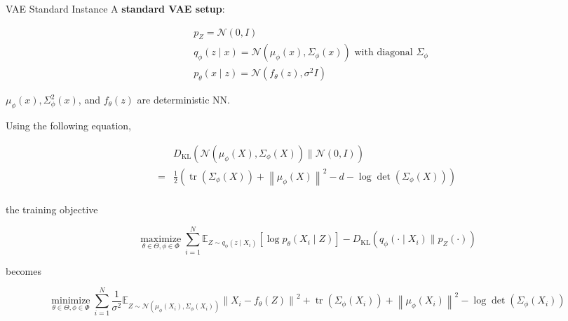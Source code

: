 \begin{frame}[allowframebreaks]

\begin{mydefinitionblock}{11.17}{VAE Standard Instance}
    A \textbf{standard VAE setup}:

    $$
    \begin{aligned}
    & p_{Z}=\mathcal{N}(0, I) \\
    & q_{\phi}(z \mid x)=\mathcal{N}\left(\mu_{\phi}(x), \Sigma_{\phi}(x)\right) \text { with diagonal } \Sigma_{\phi} \\
    & p_{\theta}(x \mid z)=\mathcal{N}\left(f_{\theta}(z), \sigma^{2} I\right)
    \end{aligned}
    $$

    $\mu_{\phi}(x), \Sigma_{\phi}^{2}(x)$, and $f_{\theta}(z)$ are deterministic NN.

    \par\noindent\textcolor{gray}{\hdashrule{\textwidth}{0.4pt}{1pt 2pt}}

    Using the following equation,

    $$
    \begin{aligned}
    & D_{\mathrm{KL}}\left(\mathcal{N}\left(\mu_{\phi}(X), \Sigma_{\phi}(X)\right) \| \mathcal{N}(0, I)\right) \\
    = & \frac{1}{2}\left(\operatorname{tr}\left(\Sigma_{\phi}(X)\right)+\left\|\mu_{\phi}(X)\right\|^{2}-d-\log \operatorname{det}\left(\Sigma_{\phi}(X)\right)\right) \\
    \end{aligned}
    $$

    the training objective

    $$
    \underset{\theta \in \Theta, \phi \in \Phi}{\operatorname{maximize}} \sum_{i=1}^{N} \mathbb{E}_{Z \sim q_{\phi}\left(z \mid X_{i}\right)}\left[\log p_{\theta}\left(X_{i} \mid Z\right)\right]-D_{\mathrm{KL}}\left(q_{\phi}\left(\cdot \mid X_{i}\right) \| p_{Z}(\cdot)\right)
    $$

    becomes

    $$
    \underset{\theta \in \Theta, \phi \in \Phi}{\operatorname{minimize}} \sum_{i=1}^{N} \frac{1}{\sigma^{2}} \mathbb{E}_{Z \sim \mathcal{N}\left(\mu_{\phi}\left(X_{i}\right), \Sigma_{\phi}\left(X_{i}\right)\right)}\left\|X_{i}-f_{\theta}(Z)\right\|^{2}+\operatorname{tr}\left(\Sigma_{\phi}\left(X_{i}\right)\right)+\left\|\mu_{\phi}\left(X_{i}\right)\right\|^{2}-\log \operatorname{det}\left(\Sigma_{\phi}\left(X_{i}\right)\right)
    $$
\end{mydefinitionblock}

\end{frame}

